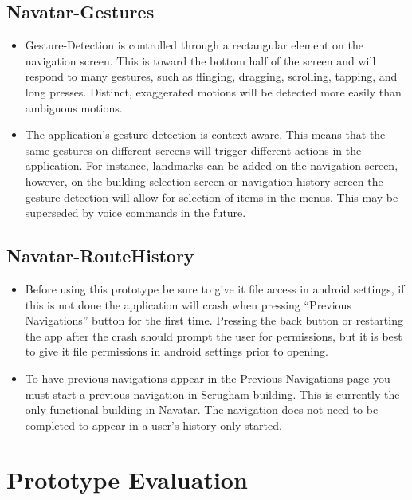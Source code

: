 \documentclass{scrreprt}
\begin{document}
\section{Navatar-Gestures}
	\begin{itemize}
		\item Gesture-Detection is controlled through a rectangular element on the navigation screen. This is toward the bottom half of the screen and will respond to many gestures, such as flinging, dragging, scrolling, tapping, and long presses. Distinct, exaggerated motions will be detected more easily than ambiguous motions.
		\item The application's gesture-detection is context-aware. This means that the same gestures on different screens will trigger different actions in the application. For instance, landmarks can be added on the navigation screen, however, on the building selection screen or navigation history screen the gesture detection will allow for selection of items in the menus. This may be superseded by voice commands in the future.
	\end{itemize}
	
\pagebreak

\section{Navatar-RouteHistory}
	\begin{itemize}
		\item Before using this prototype be sure to give it file access in android settings, if this is not done the application will crash when pressing “Previous Navigations” button for the first time. Pressing the back button or restarting the app after the crash should prompt the user for permissions, but it is best to give it file permissions in android settings prior to opening.

		\item To have previous navigations appear in the Previous Navigations page you must start a previous navigation in Scrugham building. This is currently the only functional building in Navatar. The navigation does not need to be completed to appear in a user's history only started.
		
	\end{itemize}

\chapter{Prototype Evaluation}
\end{document}
